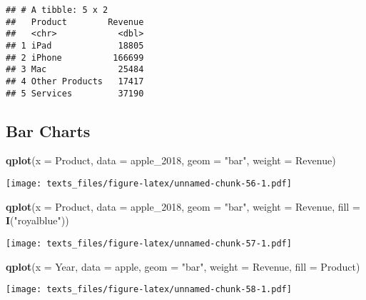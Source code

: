 \documentclass[]{book}
\newenvironment{Shaded}{\begin{snugshade}}{\end{snugshade}}
\newcommand{\DataTypeTok}[1]{\textcolor[rgb]{0.13,0.29,0.53}{#1}}
\newcommand{\DecValTok}[1]{\textcolor[rgb]{0.00,0.00,0.81}{#1}}
\newcommand{\KeywordTok}[1]{\textcolor[rgb]{0.13,0.29,0.53}{\textbf{#1}}}
\newcommand{\NormalTok}[1]{#1}
\newcommand{\StringTok}[1]{\textcolor[rgb]{0.31,0.60,0.02}{#1}}
\begin{document}
\begin{verbatim}
## # A tibble: 5 x 2
##   Product        Revenue
##   <chr>            <dbl>
## 1 iPad             18805
## 2 iPhone          166699
## 3 Mac              25484
## 4 Other Products   17417
## 5 Services         37190
\end{verbatim}

\hypertarget{qplotbars}{%
\subsection*{Bar Charts}\label{qplotbars}}

\begin{Shaded}
\begin{Highlighting}[]
\KeywordTok{qplot}\NormalTok{(}\DataTypeTok{x =}\NormalTok{ Product, }\DataTypeTok{data =}\NormalTok{ apple_}\DecValTok{2018}\NormalTok{, }\DataTypeTok{geom =} \StringTok{"bar"}\NormalTok{, }\DataTypeTok{weight =}\NormalTok{ Revenue) }
\end{Highlighting}
\end{Shaded}

\texttt{[image: texts\_files/figure-latex/unnamed-chunk-56-1.pdf]}

\begin{Shaded}
\begin{Highlighting}[]
\KeywordTok{qplot}\NormalTok{(}\DataTypeTok{x =}\NormalTok{ Product, }\DataTypeTok{data =}\NormalTok{ apple_}\DecValTok{2018}\NormalTok{, }\DataTypeTok{geom =} \StringTok{"bar"}\NormalTok{, }\DataTypeTok{weight =}\NormalTok{ Revenue, }\DataTypeTok{fill =} \KeywordTok{I}\NormalTok{(}\StringTok{"royalblue"}\NormalTok{)) }
\end{Highlighting}
\end{Shaded}

\texttt{[image: texts\_files/figure-latex/unnamed-chunk-57-1.pdf]}

\begin{Shaded}
\begin{Highlighting}[]
\KeywordTok{qplot}\NormalTok{(}\DataTypeTok{x =}\NormalTok{ Year, }\DataTypeTok{data =}\NormalTok{ apple, }\DataTypeTok{geom =} \StringTok{"bar"}\NormalTok{, }\DataTypeTok{weight =}\NormalTok{ Revenue, }\DataTypeTok{fill =}\NormalTok{ Product)}
\end{Highlighting}
\end{Shaded}

\texttt{[image: texts\_files/figure-latex/unnamed-chunk-58-1.pdf]}
\end{document}
